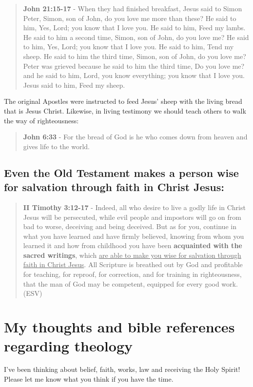 \documentclass[11pt]{article}
\begin{document}
\begin{quote}
\textbf{John 21:15-17} - When they had finished breakfast, Jesus said to Simon Peter, Simon, son of John, do you love me more than these? He said to him, Yes, Lord; you know that I love you. He said to him, Feed my lambs. He said to him a second time, Simon, son of John, do you love me? He said to him, Yes, Lord; you know that I love you. He said to him, Tend my sheep. He said to him the third time, Simon, son of John, do you love me? Peter was grieved because he said to him the third time, Do you love me? and he said to him, Lord, you know everything; you know that I love you. Jesus said to him, Feed my sheep.
\end{quote}

The original Apostles were instructed to feed Jesus' sheep with the living bread that is Jesus Christ. Likewise, in living testimony we should teach others to walk the way of righteousness:

\begin{quote}
\textbf{John 6:33} - For the bread of God is he who comes down from heaven and gives life to the world.
\end{quote}

\subsection{Even the Old Testament makes a person wise for salvation through faith in Christ Jesus:}
\label{sec:org1f7bce5}

\begin{quote}
\textbf{II Timothy 3:12-17} - Indeed, all who desire to live a godly life in Christ Jesus will be persecuted, while evil people and impostors will go on from bad to worse, deceiving and being deceived. But as for you, continue in what you have learned and have firmly believed, knowing from whom you learned it and how from childhood you have been \textbf{acquainted with the sacred writings}, which \uline{are able to make you wise for salvation through faith in Christ Jesus}. All Scripture is breathed out by God and profitable for teaching, for reproof, for correction, and for training in righteousness, that the man of God may be competent, equipped for every good work. (ESV)
\end{quote}

\section{My thoughts and bible references regarding theology}
\label{sec:org041714e}
I've been thinking about belief, faith, works, law and receiving the Holy Spirit!
Please let me know what you think if you have the time.
\end{document}
